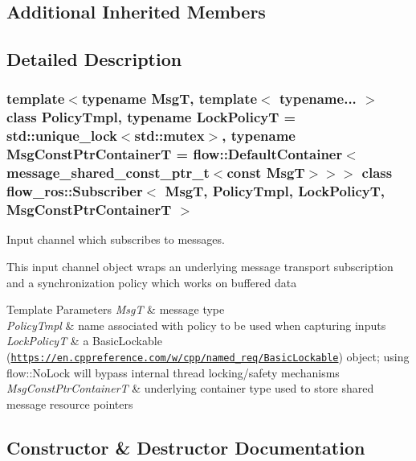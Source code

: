 \subsection*{Additional Inherited Members}


\subsection{Detailed Description}
\subsubsection*{template$<$typename MsgT, template$<$ typename... $>$ class Policy\+Tmpl, typename Lock\+PolicyT = std\+::unique\+\_\+lock$<$std\+::mutex$>$, typename Msg\+Const\+Ptr\+ContainerT = flow\+::\+Default\+Container$<$message\+\_\+shared\+\_\+const\+\_\+ptr\+\_\+t$<$const Msg\+T$>$$>$$>$\newline
class flow\+\_\+ros\+::\+Subscriber$<$ Msg\+T, Policy\+Tmpl, Lock\+Policy\+T, Msg\+Const\+Ptr\+Container\+T $>$}

Input channel which subscribes to messages. 

This input channel object wraps an underlying message transport subscription and a synchronization policy which works on buffered data


\begin{DoxyTemplParams}{Template Parameters}
{\em MsgT} & message type \\
\hline
{\em Policy\+Tmpl} & name associated with policy to be used when capturing inputs \\
\hline
{\em Lock\+PolicyT} & a Basic\+Lockable (\href{https://en.cppreference.com/w/cpp/named_req/BasicLockable}{\tt https\+://en.\+cppreference.\+com/w/cpp/named\+\_\+req/\+Basic\+Lockable}) object; using {\ttfamily flow\+::\+No\+Lock} will bypass internal thread locking/safety mechanisms \\
\hline
{\em Msg\+Const\+Ptr\+ContainerT} & underlying container type used to store shared message resource pointers \\
\hline
\end{DoxyTemplParams}


\subsection{Constructor \& Destructor Documentation}
\mbox{\label{classflow__ros_1_1_subscriber_ae47148b0782dd9d38cd68b7860751fe6}} 
